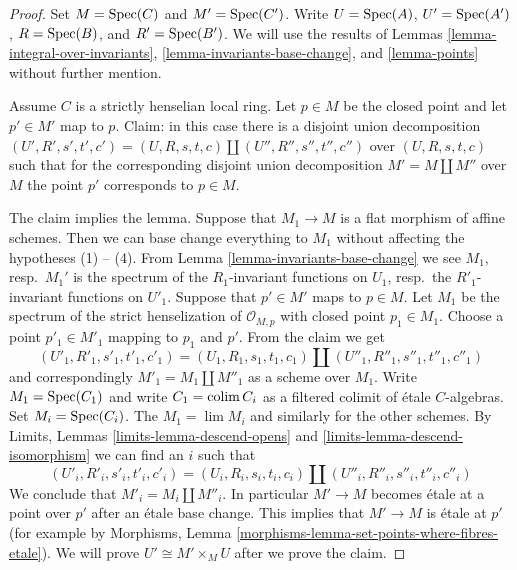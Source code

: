 \begin{proof}
Set $M = \mathop{\mathrm{Spec}}(C)$ and $M' = \mathop{\mathrm{Spec}}(C')$.
Write $U = \mathop{\mathrm{Spec}}(A)$, $U' = \mathop{\mathrm{Spec}}(A')$, $R = \mathop{\mathrm{Spec}}(B)$, and
$R' = \mathop{\mathrm{Spec}}(B')$. We will use the results of
Lemmas \ref{lemma-integral-over-invariants},
\ref{lemma-invariants-base-change}, and
\ref{lemma-points}
without further mention.

\medskip\noindent
Assume $C$ is a strictly henselian local ring. Let $p \in M$
be the closed point and let $p' \in M'$ map to $p$.
Claim: in this case there is a disjoint union decomposition
$(U', R', s', t', c') = (U, R, s, t, c) \amalg (U'', R'', s'', t'', c'')$
over $(U, R, s, t, c)$ such that for the corresponding
disjoint union decomposition $M' = M \amalg M''$ over $M$
the point $p'$ corresponds to $p \in M$.

\medskip\noindent
The claim implies the lemma. Suppose that $M_1 \to M$ is a flat morphism
of affine schemes. Then we can base change everything to $M_1$
without affecting the hypotheses (1) -- (4).
From Lemma \ref{lemma-invariants-base-change}
we see $M_1$, resp.\ $M_1'$ is the spectrum of the
$R_1$-invariant functions on $U_1$,
resp.\ the $R'_1$-invariant functions on $U'_1$.
Suppose that $p' \in M'$ maps to $p \in M$.
Let $M_1$ be the spectrum of the strict henselization of
$\mathcal{O}_{M, p}$ with closed point $p_1 \in M_1$.
Choose a point $p'_1 \in M'_1$ mapping to $p_1$ and $p'$.
From the claim we get
$$
(U'_1, R'_1, s'_1, t'_1, c'_1) =
(U_1, R_1, s_1, t_1, c_1) \amalg
(U''_1, R''_1, s''_1, t''_1, c''_1)
$$
and correspondingly $M'_1 = M_1 \amalg M''_1$ as a scheme over $M_1$.
Write $M_1 = \mathop{\mathrm{Spec}}(C_1)$ and write $C_1 = \mathop{\mathrm{colim}}\nolimits C_i$ as a filtered
colimit of \'etale $C$-algebras. Set $M_i = \mathop{\mathrm{Spec}}(C_i)$.
The $M_1 = \lim M_i$ and similarly for the other schemes.
By Limits, Lemmas \ref{limits-lemma-descend-opens} and
\ref{limits-lemma-descend-isomorphism}
we can find an $i$ such that
$$
(U'_i, R'_i, s'_i, t'_i, c'_i) =
(U_i, R_i, s_i, t_i, c_i) \amalg
(U''_i, R''_i, s''_i, t''_i, c''_i)
$$
We conclude that $M'_i = M_i \amalg M''_i$. In particular
$M' \to M$ becomes \'etale at a point over $p'$ after an
\'etale base change. This implies that $M' \to M$ is \'etale at $p'$
(for example by Morphisms, Lemma
\ref{morphisms-lemma-set-points-where-fibres-etale}).
We will prove $U' \cong M' \times_M U$ after we prove the claim.


\end{proof}
